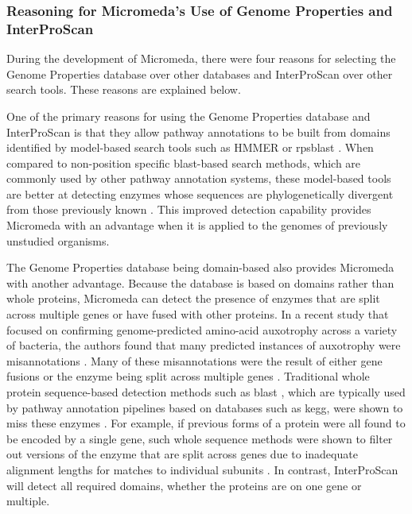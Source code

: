 \subsubsection{Reasoning for Micromeda's Use of Genome Properties and 
InterProScan} 

During the development of Micromeda, there were four reasons for selecting the 
Genome Properties database over other databases and InterProScan over other 
search tools. These reasons are explained below.

One of the primary reasons for using the Genome Properties database and 
InterProScan is that they allow pathway annotations to be built from domains 
identified by model-based search tools such as HMMER \cite{eddy2011accelerated} 
or \gls{rpsblast} \cite{mcginnis2004blast}. When compared to non-position
specific \gls{blast}-based \cite{altschul1990basic} search methods, which are 
commonly used by other pathway annotation systems, these model-based tools are 
better at detecting enzymes whose sequences are phylogenetically divergent from 
those previously known \cite{eddy2011accelerated}. This improved detection 
capability provides Micromeda with an advantage when it is applied to the 
genomes of previously unstudied organisms.

The Genome Properties database being domain-based also provides Micromeda with 
another advantage. Because the database is based on domains rather than whole 
proteins, Micromeda can detect the presence of enzymes that are split across 
multiple genes or have fused with other proteins. In a recent study that focused 
on confirming genome-predicted amino-acid auxotrophy across a variety of 
bacteria, the authors found that many predicted instances of auxotrophy were 
misannotations \cite{price2018filling}. Many of these misannotations were the 
result of either gene fusions or the enzyme being split across multiple genes 
\cite{price2018filling}. Traditional whole protein sequence-based detection 
methods such as \gls{blast} \cite{altschul1990basic}, which are typically used 
by pathway annotation pipelines based on databases such as \gls{kegg}, were 
shown to miss these enzymes \cite{price2018filling}. For example, if previous 
forms of a protein were all found to be encoded by a single gene, such whole 
sequence methods were shown to filter out versions of the enzyme that are split 
across genes due to inadequate alignment lengths for matches to individual 
subunits \cite{price2018filling}. In contrast, InterProScan will detect all 
required domains, whether the proteins are on one gene or multiple.

